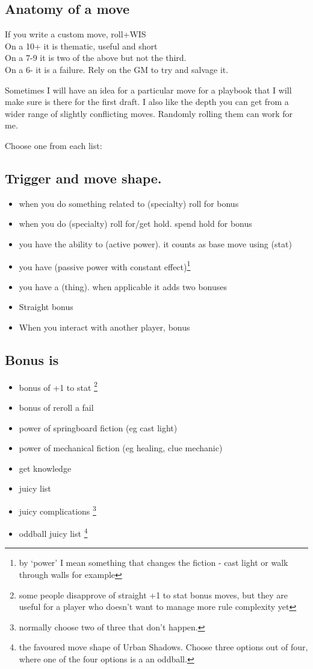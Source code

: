 \documentclass{tufte-handout}
\begin{document}
 \subsection{Anatomy of a move}
If you write a custom move, roll+WIS
\\On a 10+ it is thematic, useful and short 
\\On a 7-9  it is two of the above but not the third.
\\On a 6- it is a failure. Rely on the GM to try and salvage it.

Sometimes I will have an idea for a particular move for a playbook that I will make sure is there for the first draft. I also like the depth you can get from a wider range of slightly conflicting moves. Randomly rolling them can work for me.

Choose one from each list:

\subsection{Trigger and move shape.}
\begin{itemize}
\item when you do something related to (specialty) roll for bonus
\item when you do (specialty) roll for/get hold. spend hold for bonus
\item you have the ability to (active power). it counts as base move using (stat)
\item you have (passive power with constant effect)\footnote{by `power' I mean something that changes the fiction - cast light or walk through walls for example}
\item you have a (thing). when applicable it adds two bonuses
\item Straight bonus
\item When you interact with another player, bonus
\end{itemize}

\subsection{Bonus is}
\begin{itemize}
\item bonus of +1 to stat  \footnote{some people disapprove of straight +1 to stat bonus moves, but they are useful for a player who doesn't want to manage more rule complexity yet}
\item bonus of reroll a fail
\item power of springboard fiction (eg cast light)
\item power of mechanical fiction (eg healing, clue mechanic)
\item get knowledge 
\item juicy list
\item juicy complications \footnote{normally choose two of three that don't happen.}
\item oddball juicy list \footnote{the favoured move shape of Urban Shadows. Choose three options out of four, where one of the four options is a an oddball.}
\end{itemize}
\end{document}
